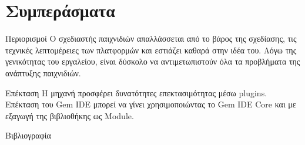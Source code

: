 \documentclass{beamer}
\begin{document}
	\section{Συμπεράσματα}
	\begin{frame}{Περιορισμοί}
		O σχεδιαστής παιχνιδιών απαλλάσσεται από το βάρος της σχεδίασης, τις τεχνικές λεπτομέρειες των πλατφορμών και εστιάζει καθαρά στην ιδέα του.
		\newline
		\newline
		Λόγω της γενικότητας του εργαλείου, είναι δύσκολο να αντιμετωπιστούν όλα τα προβλήματα της ανάπτυξης παιχνιδιών.
	\end{frame}		
	\begin{frame}{Επέκταση}
		Η μηχανή προσφέρει δυνατότητες επεκτασιμότητας μέσω plugins. 
		\newline
		\newline
		Επέκταση του \alert{Gem IDE} μπορεί να γίνει χρησιμοποιώντας το \alert{Gem IDE Core} και με εξαγωγή της βιβλιοθήκης ως \alert{Module}.
	\end{frame}		
	
	
	\begin{frame}[allowframebreaks]{Βιβλιογραφία}
		\printbibliography[heading=none]
	\end{frame}
	
\end{document}
